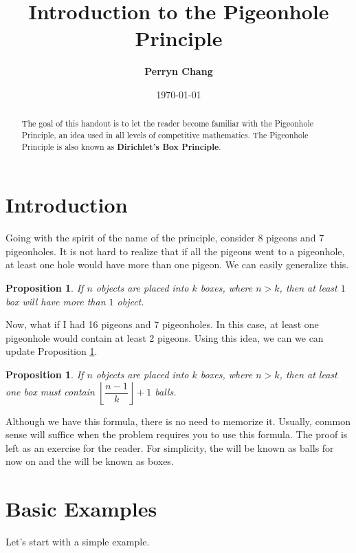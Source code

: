 \documentclass[l1pt]{article}
\title{\textbf{Introduction to the Pigeonhole Principle}}
\author{\textbf{Perryn Chang}}
\date{\today}
\theoremstyle{plain}
\newtheorem{prop}[thm]{Proposition}
\theoremstyle{definition}
\theoremstyle{remark}
\begin{document}
\maketitle

\begin{abstract}
The goal of this handout is to let the reader become familiar with the Pigeonhole Principle, an idea used in all levels of competitive mathematics. The Pigeonhole Principle is also known as \textbf{Dirichlet's Box Principle}.
\end{abstract}

\tableofcontents

\eject

\section{Introduction}
Going with the spirit of the name of the principle, consider $8$ pigeons and $7$ pigeonholes. It is not hard to realize that if all the pigeons went to a pigeonhole, at least one hole would have more than one pigeon. We can easily generalize this.

\begin{mdframed}
    \begin{prop}
    \label{prop:beginintro}
    If $n$ objects are placed into $k$ boxes, where $n>k$, then at least $1$ box will have more than $1$ object.
    \end{prop}
\end{mdframed}

Now, what if I had 16 pigeons and 7 pigeonholes. In this case, at least one pigeonhole would contain at least 2 pigeons. Using this idea, we can we can update Proposition \ref{prop:beginintro}.

\begin{mdframed}
    \begin{prop}
    If $n$ objects are placed into $k$ boxes, where $n>k$, then at least one box must contain $\left\lfloor \dfrac{n-1}{k} \right\rfloor + 1 $ balls.
    \end{prop}
\end{mdframed}

Although we have this formula, there is no need to memorize it. Usually, common sense will suffice when the problem requires you to use this formula. The proof is left as an exercise for the reader. For simplicity, the  will be known as balls for now on and the  will be known as boxes.

\section{Basic Examples}
Let's start with a simple example.
\end{document}
